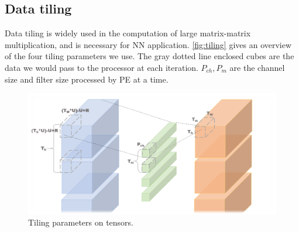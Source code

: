 \subsection{Data tiling}
Data tiling is widely used in the computation of large matrix-matrix multiplication, and is necessary for NN application. \autoref{fig:tiling} gives an overview of the four tiling parameters we use. The gray dotted line enclosed cubes are the data we would pass to the processor at each iteration. $P_{ch},P_m$ are the channel size and filter size processed by PE at a time. \\
\begin{figure}[h]
    \centering
    \includegraphics[width=1\linewidth]{inc/4_proposed_architecture/figure/tiling.png}
    \caption{Tiling parameters on tensors.}
    \label{fig:tiling}
\end{figure}

